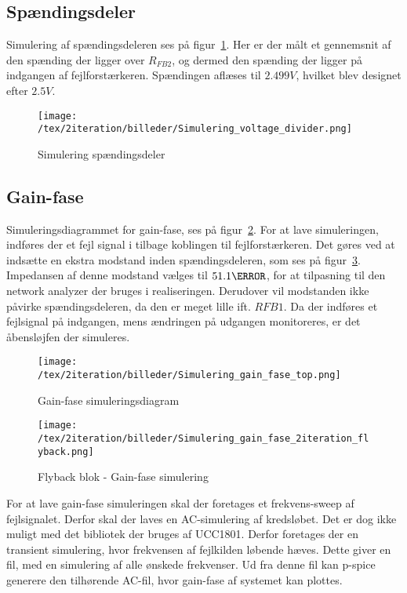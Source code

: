 
\subsection{Spændingsdeler}
Simulering af spændingsdeleren ses på figur~\ref{fig:simulering_voltage_divider}. Her er der målt et gennemsnit af den spænding der ligger over $R_{FB2}$, og dermed den spænding der ligger på indgangen af fejlforstærkeren. Spændingen aflæses til $2.499V$, hvilket blev designet efter $2.5V$.


\begin{figure}[H]
	\center
	\texttt{[image: /tex/2iteration/billeder/Simulering\_voltage\_divider.png]}
	\caption{Simulering spændingsdeler}
	\label{fig:simulering_voltage_divider}
\end{figure}


\subsection{Gain-fase}
Simuleringsdiagrammet for gain-fase, ses på figur~\ref{fig:sim_gain_fase_top}. For at lave simuleringen, indføres der et fejl signal i tilbage koblingen til fejlforstærkeren. Det gøres ved at indsætte en ekstra modstand inden spændingsdeleren, som ses på figur~\ref{fig:sim_gain_fase_2iteration}. Impedansen af denne modstand vælges til $51.1\ohm$, for at tilpasning til den network analyzer der bruges i realiseringen. Derudover vil modstanden ikke påvirke spændingsdeleren, da den er meget lille ift. $RFB1$. Da der indføres et fejlsignal på indgangen, mens ændringen på udgangen monitoreres, er det åbensløjfen der simuleres. 

\begin{figure}[H]
	\center
	\texttt{[image: /tex/2iteration/billeder/Simulering\_gain\_fase\_top.png]}
	\caption{Gain-fase simuleringsdiagram}
	\label{fig:sim_gain_fase_top}
\end{figure}

\begin{figure}[H]
	\center
	\texttt{[image: /tex/2iteration/billeder/Simulering\_gain\_fase\_2iteration\_flyback.png]}
	\caption{Flyback blok - Gain-fase simulering}
	\label{fig:sim_gain_fase_2iteration}
\end{figure}

For at lave gain-fase simuleringen skal der foretages et frekvens-sweep af fejlsignalet. Derfor skal der laves en AC-simulering af kredsløbet. Det er dog ikke muligt med det bibliotek der bruges af UCC1801. Derfor foretages der en transient simulering, hvor frekvensen af fejlkilden løbende hæves. Dette giver en fil, med en simulering af alle ønskede frekvenser. Ud fra denne fil kan p-spice generere den tilhørende AC-fil, hvor gain-fase af systemet kan plottes. 

